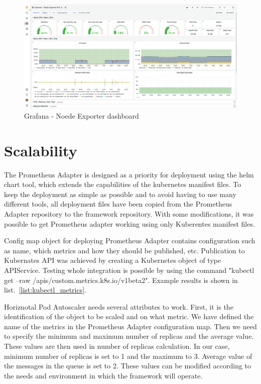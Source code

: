 \begin{figure}[H]
    \centering
    \includegraphics[width=\linewidth]{other-fig/grafana.png}
    \caption{Grafana - Noede Exporter dashboard}
    \label{fig:grafana_node_exporter}
\end{figure}


\section{Scalability}
\label{section:scalability}

The Prometheus Adapter is designed as a priority for deployment using the helm chart tool, which extends the capabilities of the kubernetes manifest files. To keep the deployment as simple as possible and to avoid having to use many different tools, all deployment files have been copied from the Prometheus Adapter repository to the framework repository. With some modifications, it was possible to get Prometheus adapter working using only Kuberentes manifest files.

Config map object for deploying Prometheus Adapter contains configuration such as name, which metrics and how they should be published, etc. Publication to Kubernates API was achieved by creating a Kubernetes object of type APIService. Testing whole integration is possible by using the command "kubectl get --raw /apis/custom.metrics.k8s.io/v1beta2". Example results is shown in list.~\ref{list:kubectl_metrics}.

Horiznotal Pod Autoscaler needs several attributes to work. First, it is the identification of the object to be scaled and on what metric. We have defined the name of the metrics in the Prometheus Adapter configuration map. Then we need to specify the minimum and maximum number of replicas and the average value. These values are then used in number of replicas calculation. In our case, minimum number of replicas is set to 1 and the maximum to 3. Average value of the messages in the queue is set to 2. These values can be modified according to the needs and environment in which the framework will operate.

